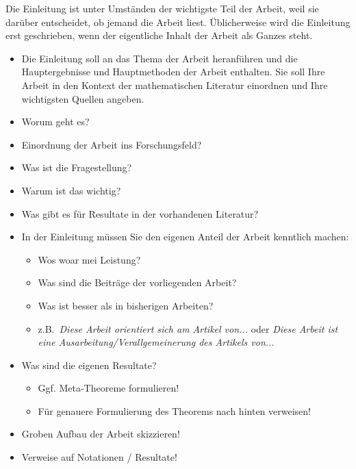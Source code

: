 \documentclass[a4paper,11pt,bibliography=totoc,listof=totoc,headinclude=true,cleardoublepage=empty,oneside]{scrbook}
\begin{document}
{\color{change}

\noindent
Die Einleitung ist unter Umständen der wichtigste Teil der Arbeit, weil sie darüber entscheidet, ob jemand die Arbeit liest. Üblicherweise wird die Einleitung erst geschrieben, wenn der eigentliche Inhalt der Arbeit als Ganzes steht.

\begin{itemize}
 

\item Die Einleitung soll an das Thema der Arbeit heranführen und die Hauptergebnisse und Hauptmethoden der Arbeit enthalten. Sie soll Ihre Arbeit in den Kontext der mathematischen Literatur einordnen und Ihre wichtigsten Quellen angeben.

\item Worum geht es?
\item Einordnung der Arbeit ins Forschungsfeld?
\item Was ist die Fragestellung?
\item Warum ist das wichtig?
\item Was gibt es für Resultate in der vorhandenen Literatur?

\item In der Einleitung müssen Sie den eigenen Anteil der Arbeit kenntlich machen:
\begin{itemize}
\item Wos woar mei Leistung?
\item Was sind die Beiträge der vorliegenden Arbeit?
\item Was ist besser als in bisherigen Arbeiten?
\item z.B.\ \emph{Diese Arbeit orientiert sich am Artikel von...} oder \emph{Diese Arbeit
ist eine Ausarbeitung/Verallgemeinerung des Artikels von...}
\end{itemize}

\item Was sind die eigenen Resultate?
\begin{itemize}
\item Ggf. Meta-Theoreme formulieren!
\item Für genauere Formulierung des Theorems nach hinten verweisen!
\end{itemize}

\item Groben Aufbau der Arbeit skizzieren!
\item Verweise auf Notationen / Resultate!
\end{itemize}
}

\end{document}
